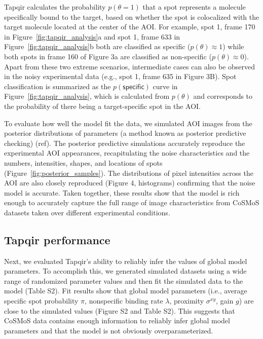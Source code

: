 Tapqir calculates the probability $p(\theta=1)$ that a spot represents a molecule specifically bound to the target, based on whether the spot is colocalized with the target molecule located at the center of the AOI.  For example, spot 1, frame 170 in Figure~\ref{fig:tapqir_analysis}a and spot 1, frame 633 in Figure~\ref{fig:tapqir_analysis}b both are classified as specific ($p(\theta) \approx 1$) while both spots in frame 160 of Figure 3a are classified as non-specific ($p(\theta) \approx 0$). Apart from these two extreme scenarios, intermediate cases can also be observed in the noisy experimental data (e.g., spot 1, frame 635 in Figure 3B). Spot classification is summarized as the $p(\mathsf{specific})$ curve in Figure~\ref{fig:tapqir_analysis}, which is calculated from $p(\theta)$ and corresponds to the probability of there being a target-specific spot in the AOI. 


To evaluate how well the model fit the data, we simulated AOI images from the posterior distributions of parameters (a method known as posterior predictive checking) (ref). The posterior predictive simulations accurately reproduce the experimental AOI appearances, recapitulating the noise characteristics and the numbers, intensities, shapes, and locations of spots (Figure~\ref{fig:posterior_samples}).  The distributions of pixel intensities across the AOI are also closely reproduced (Figure 4, histograms) confirming that the noise model is accurate. Taken together, these results show that the model is rich enough to accurately capture the full range of image characteristics from CoSMoS datasets taken over different experimental conditions.

\subsection*{Tapqir performance}

Next, we evaluated Tapqir's ability to reliably infer the values of global model parameters. To  accomplish this, we generated simulated datasets  using  a wide range of randomized parameter values and then fit the simulated data to the model (Table S2). Fit results show that global model parameters (i.e., average specific spot probability $\pi$, nonspecific binding rate $\lambda$, proximity $\sigma^{xy}$, gain $g$) are close to the simulated values  (Figure S2 and Table S2). This suggests that CoSMoS data contains enough information to reliably infer global model parameters and that the model is not obviously overparameterized.

